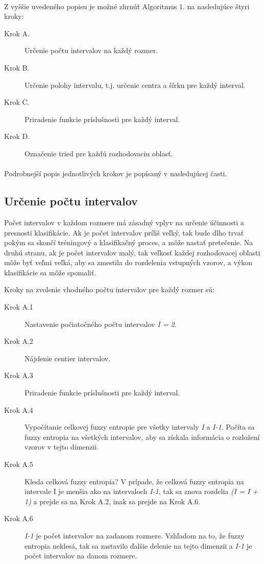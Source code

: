 \paragraph*{} Z vyššie uvedeného popisu je možné zhrnúť Algoritmus 1. na  nasledujúce štyri kroky:

\begin{description}
\item[Krok A.] Určenie počtu intervalov na každý rozmer.
\item[Krok B.] Určenie polohy intervalu, t.j. určenie centra a šírku pre každý interval.
\item[Krok C.] Priradenie funkcie príslušnosti pre každý interval.
\item[Krok D.] Označenie tried pre každú rozhodovaciu oblasť.

\end{description}

\paragraph*{}
Podrobnejší popis jednotlivých krokov je popísaný v nasledujúcej časti. 

\subsection{Určenie počtu intervalov}
Počet intervalov v každom rozmere má zásadný vplyv na určenie účinnosti a presnosti klasifikácie. Ak je počet intervalov príliš veľký, tak bude dlho trvať pokým sa skončí tréningový a klasifikačný proces, a môže nastať pretečenie. 
Na druhú stranu, ak je počet intervalov malý, tak veľkosť každej rozhodovacej oblasti môže byť veľmi veľká, aby sa zmestila do rozdelenia vstupných vzorov, a výkon klasifikácie sa môže spomaliť. \cite{lee2001}

Kroky na zvolenie vhodného počtu intervalov pre každý rozmer sú: 
\begin{description}
\item[Krok A.1] Nastavenie počiatočného počtu intervalov \textit{I = 2}.
\item[Krok A.2] Nájdenie centier intervalov. 
\item[Krok A.3] Priradenie funkcie príslušnosti pre každý interval. 
\item[Krok A.4] Vypočítanie celkovej fuzzy entropie pre všetky intervaly \textit{I} a \textit{I-1}. 
Počíta sa fuzzy entropia na všetkých intervalov, aby sa získala informácia o rozložení vzorov v tejto dimenzii.
\item[Krok A.5] Klesla celková fuzzy entropia? 
V prípade, že celková fuzzy entropia na intervale I je menšia ako na intervaloch \textit{I-1}, tak sa znova rozdelia \textit{(I = I + 1)} a prejde sa na Krok A.2, inak sa prejde na Krok A.6. 
\item[Krok A.6]\textit{ I-1} je počet intervalov na zadanom rozmere. 
Vzhľadom na to, že fuzzy entropia neklesá, tak sa zastavilo ďalšie delenie na tejto dimenzii a \textit{I-1} je počet intervalov na danom rozmere.   
\end{description}

